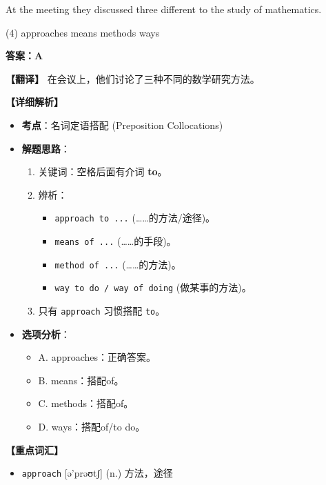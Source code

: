 \documentclass[11pt, a4paper]{article}
\newcommand{\analysis}[4]{
    \begin{solutionbox}
        \textbf{答案：#1}
        
        \textbf{【翻译】} #2
        
        \textbf{【详细解析】}
        #3
        
        \textbf{【重点词汇】}
        #4
    \end{solutionbox}
}
\newcommand{\blank}{\underline{\hspace{1.5cm}}}
\begin{document}
\begin{questions}
    \item At the meeting they discussed three different \blank to the study of mathematics.
    \begin{tasks}(4)
        \task approaches \task means \task methods \task ways
    \end{tasks}
    \analysis{A}{在会议上，他们讨论了三种不同的数学研究方法。}{
        \begin{itemize}
            \item \textbf{考点}：名词定语搭配 (Preposition Collocations)
            \item \textbf{解题思路}：
                \begin{enumerate}
                    \item 关键词：空格后面有介词 \textbf{to}。
                    \item 辨析：
                        \begin{itemize}
                            \item \texttt{approach to ...} (……的方法/途径)。
                            \item \texttt{means of ...} (……的手段)。
                            \item \texttt{method of ...} (……的方法)。
                            \item \texttt{way to do / way of doing} (做某事的方法)。
                        \end{itemize}
                    \item 只有 \texttt{approach} 习惯搭配 \texttt{to}。
                \end{enumerate}
            \item \textbf{选项分析}：
                \begin{itemize}
                    \item A. approaches：正确答案。
                    \item B. means：搭配of。
                    \item C. methods：搭配of。
                    \item D. ways：搭配of/to do。
                \end{itemize}
        \end{itemize}
    }{
        \begin{itemize}
            \item \texttt{approach} [ə'prəʊtʃ] (n.) 方法，途径
        \end{itemize}
    }


\end{questions}
\end{document}
